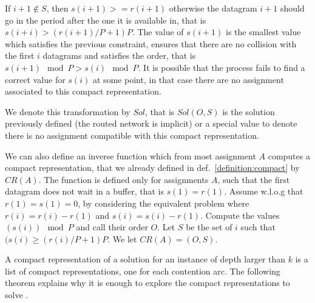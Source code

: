 \documentclass[english]{article}
\begin{document}
If $i+1 \notin S$, then $s(i+1) >= r(i+1)$ otherwise the datagram $i+1$ should go in the period after the one it is available in, that is $s(i+i) > (r(i+1)/P + 1)P$.
The value of  $s(i+1)$ is the smallest value which satisfies the previous constraint,
ensures that there are no collision with the first $i$ datagrams and  satisfies the order, that is $s(i+1) \mod P > s(i) \mod P$. 
It is possible that the process fails to find a correct value for $s(i)$ at some point,
in that case there are no assignment associated to this compact representation.

We denote this transformation by $Sol$, that is $Sol(O,S)$ is the solution previously defined
(the routed network is implicit) or a special value to denote there is no assignment compatible with this compact representation. 

We can also define an inverse function which from most assignment $A$ computes a compact representation, that we already defined in def.~\ref{definition:compact} by $CR(A)$. The function is defined only for
assignments $A$, such that the first datagram does not wait in a buffer, that is $s(1) = r(1)$. Assume w.l.o.g that $r(1) = s(1) = 0$, by considering the equivalent problem where $r(i)= r(i) -r(1)$ and $s(i) = s(i) - r(1)$.
Compute the values $(s(i))\mod P$ and  call their order $O$. Let 
 $S$ be the set of $i$ such that $(s(i) \geq (r(i) / P + 1) P$. We let $CR(A) = (O,S)$.

A compact representation of a solution for an instance of depth larger than $k$
is a list of compact representations, one for each contention arc. The following theorem explains why it is enough to explore the compact representations to solve \spall.
\end{document}
